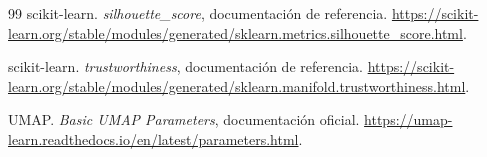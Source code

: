 \documentclass[11pt]{article}
\begin{document}
\begin{thebibliography}{99}
scikit-learn. \emph{silhouette\_score}, documentación de referencia.
\url{https://scikit-learn.org/stable/modules/generated/sklearn.metrics.silhouette_score.html}.

scikit-learn. \emph{trustworthiness}, documentación de referencia.
\url{https://scikit-learn.org/stable/modules/generated/sklearn.manifold.trustworthiness.html}.

UMAP. \emph{Basic UMAP Parameters}, documentación oficial.
\url{https://umap-learn.readthedocs.io/en/latest/parameters.html}.

\end{thebibliography}
\end{document}
